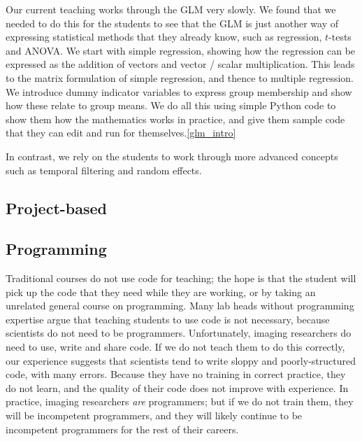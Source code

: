 Our current teaching works through the GLM very slowly. We found that we
needed to do this for the students to see that the GLM is just another way of
expressing statistical methods that they already know, such as regression,
$t$-tests and ANOVA.  We start with simple regression, showing how the
regression can be expressed as the addition of vectors and vector / scalar
multiplication.  This leads to the matrix formulation of simple regression,
and thence to multiple regression.  We introduce dummy indicator variables to
express group membership and show how these relate to group means.  We do all
this using simple Python code to show them how the mathematics works in
practice, and give them sample code that they can edit and run for themselves.\cref{glm_intro}

In contrast, we rely on the students to work through more advanced concepts
such as temporal filtering and random effects.

\subsection{Project-based}


\subsection{Programming}

Traditional courses do not use code for teaching; the hope is that the student
will pick up the code that they need while they are working, or by taking an
unrelated general course on programming.  Many lab heads without programming
expertise argue that teaching students to use code is not necessary, because
scientists do not need to be programmers.  Unfortunately, imaging researchers
do need to use, write and share code.  If we do not teach them to do this
correctly, our experience suggests that scientists tend to write sloppy and
poorly-structured code, with many errors.  Because they have no training in
correct practice, they do not learn, and the quality of their code does not
improve with experience.  In practice, imaging researchers {\em are}
programmers; but if we do not train them, they will be incompetent
programmers, and they will likely continue to be incompetent programmers for
the rest of their careers.

